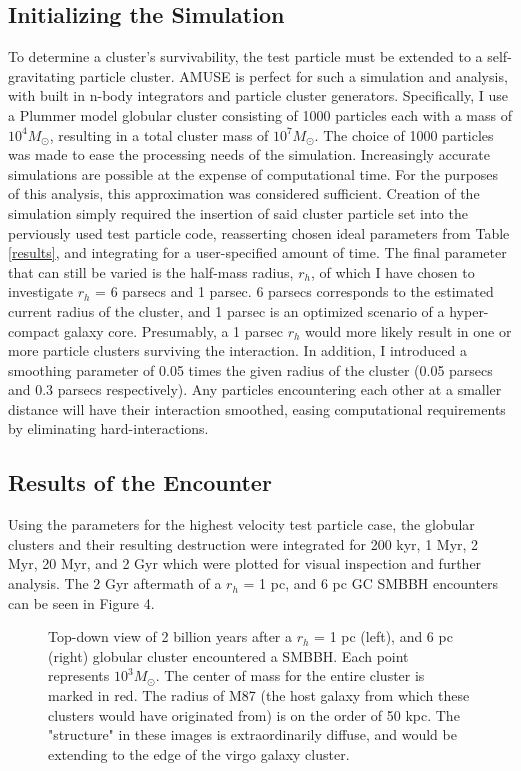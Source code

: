 \documentclass{aastex62}
\begin{document}
\subsection{Initializing the Simulation}
To determine a cluster's survivability, the test particle must be extended to a self-gravitating particle cluster. AMUSE is perfect for such a simulation and analysis, with built in n-body integrators and particle cluster generators. Specifically, I use a Plummer model globular cluster consisting of 1000 particles each with a mass of $10^4 M_{\odot}$, resulting in a total cluster mass of $10^7 M_{\odot}$. The choice of 1000 particles was made to ease the processing needs of the simulation. Increasingly accurate simulations are possible at the expense of computational time. For the purposes of this analysis, this approximation was considered sufficient. Creation of the simulation simply required the insertion of said cluster particle set into the perviously used test particle code, reasserting chosen ideal parameters from Table \ref{results}, and integrating for a user-specified amount of time. The final parameter that can still be varied is the half-mass radius, $r_{h}$, of which I have chosen to investigate  $r_{h}$ = 6 parsecs and 1 parsec. 6 parsecs corresponds to the estimated current radius of the cluster, and 1 parsec is an optimized scenario of a hyper-compact galaxy core. Presumably, a 1 parsec  $r_{h}$ would more likely result in one or more particle clusters surviving the interaction. In addition, I introduced a smoothing parameter of 0.05 times the given radius of the cluster (0.05 parsecs and 0.3 parsecs respectively). Any particles encountering each other at a smaller distance will have their interaction smoothed, easing computational requirements by eliminating hard-interactions. 
\subsection{Results of the Encounter}
Using the parameters for the highest velocity test particle case, the globular clusters and their resulting destruction were integrated for 200 kyr, 1 Myr, 2 Myr, 20 Myr, and 2 Gyr which were plotted for visual inspection and further analysis. The 2 Gyr aftermath of a $r_{h}$ = 1 pc, and 6 pc GC SMBBH encounters can be seen in Figure 4. 

\begin{figure}
\centering
\caption{Top-down view of 2 billion years after a $r_{h}$ = 1 pc (left), and 6 pc (right) globular cluster encountered a SMBBH. Each point represents $10^3 M_{\odot}$. The center of mass for the entire cluster is marked in red. The radius of M87 (the host galaxy from which these clusters would have originated from) is on the order of 50 kpc. The "structure" in these images is extraordinarily diffuse, and would be extending to the edge of the virgo galaxy cluster.}
\end{figure}
\end{document}

